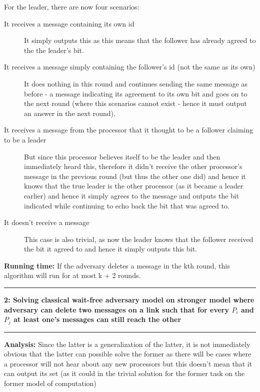 \documentclass[11pt]{article}
\newcommand\question[2]{\vspace{.25in}\hrule\textbf{#1: #2}\vspace{.5em}\hrule\vspace{.10in}}
\newcommand\analysis{\vspace{.10in}\textbf{Analysis: }\newline}
\newcommand\runtime{\vspace{.10in}\textbf{Running time: }\newline}
\begin{document}
For the leader, there are now four scenarios:
\begin{description}
\item[It receives a message containing its own id]
It simply outputs this as this means that the follower has already agreed to the the leader's bit. 
\item[It receives a message simply containing the follower's id (not the same as its own)] 
It does nothing in this round and continues sending the same message as before - a message indicating its agreement to its own bit and goes on to the next round (where this scenarios cannot exist - hence it must output an answer in the next round).  
\item[It receives a message from the processor that it thought to be a follower claiming to be a leader]
But since this processor believes itself to be the leader and then immediately heard this, therefore it didn't receive the other processor's message in the previous round (but thus the other one did) and hence it knows that the true leader is the other processor (as it became a leader earlier) and hence it simply agrees to the message and outputs the bit indicated while continuing to echo back the bit that was agreed to. 
\item[It doesn't receive a message]
This case is also trivial, as now the leader knows that the follower received the bit it agreed to and hence it simply outputs this bit. 
\end{description}

\runtime
If the adversary deletes a message in the kth round, this algorithm will run for at most k + 2 rounds.  

\newpage
\question{2}{Solving classical wait-free adversary model on stronger model where adversary can delete two messages on a link such that for every $P_{i}$ and $P_{j}$ at least one's messages can still reach the other} 

\analysis
Since the latter is a generalization of the latter, it is not immediately obvious that the latter can possible solve the former as there will be cases where a processor will not hear about any new processors but this doesn't mean that it can output its set (as it could in the trivial solution for the former task on the former model of computation)
\end{document}
